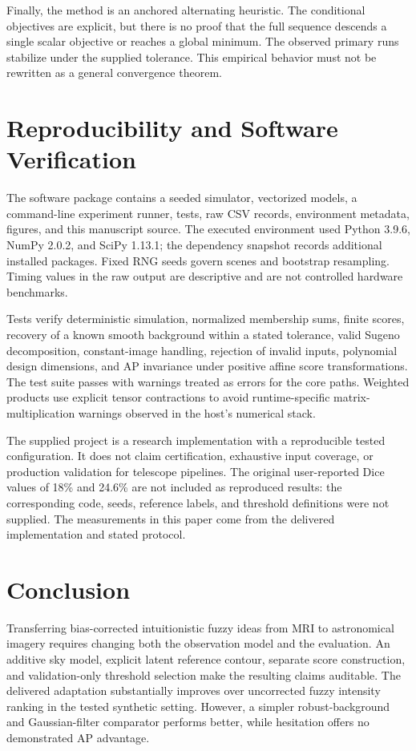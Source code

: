 \documentclass[conference]{IEEEtran}
\begin{document}
Finally, the method is an anchored alternating heuristic. The conditional objectives are explicit, but there is no proof that the full sequence descends a single scalar objective or reaches a global minimum. The observed primary runs stabilize under the supplied tolerance. This empirical behavior must not be rewritten as a general convergence theorem.

\section{Reproducibility and Software Verification}
The software package contains a seeded simulator, vectorized models, a command-line experiment runner, tests, raw CSV records, environment metadata, figures, and this manuscript source. The executed environment used Python 3.9.6, NumPy 2.0.2, and SciPy 1.13.1; the dependency snapshot records additional installed packages. Fixed RNG seeds govern scenes and bootstrap resampling. Timing values in the raw output are descriptive and are not controlled hardware benchmarks.

Tests verify deterministic simulation, normalized membership sums, finite scores, recovery of a known smooth background within a stated tolerance, valid Sugeno decomposition, constant-image handling, rejection of invalid inputs, polynomial design dimensions, and AP invariance under positive affine score transformations. The test suite passes with warnings treated as errors for the core paths. Weighted products use explicit tensor contractions to avoid runtime-specific matrix-multiplication warnings observed in the host's numerical stack.

The supplied project is a research implementation with a reproducible tested configuration. It does not claim certification, exhaustive input coverage, or production validation for telescope pipelines. The original user-reported Dice values of 18\% and 24.6\% are not included as reproduced results: the corresponding code, seeds, reference labels, and threshold definitions were not supplied. The measurements in this paper come from the delivered implementation and stated protocol.

\section{Conclusion}
Transferring bias-corrected intuitionistic fuzzy ideas from MRI to astronomical imagery requires changing both the observation model and the evaluation. An additive sky model, explicit latent reference contour, separate score construction, and validation-only threshold selection make the resulting claims auditable. The delivered adaptation substantially improves over uncorrected fuzzy intensity ranking in the tested synthetic setting. However, a simpler robust-background and Gaussian-filter comparator performs better, while hesitation offers no demonstrated AP advantage.
\end{document}
